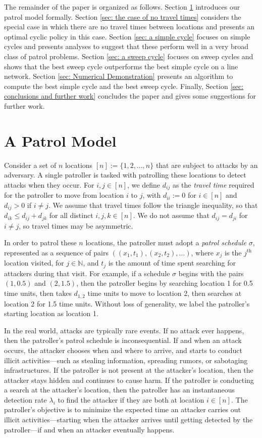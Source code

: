 \documentclass[11pt,a4paper]{article}
\begin{document}
The remainder of the paper is organized as follows.
Section \ref{sec: a patrol model} introduces our patrol model formally.
Section \ref{sec: the case of no travel times} considers the special case in which there are no travel times between locations and presents an optimal cyclic policy in this case.
Section \ref{sec: a simple cycle} focuses on simple cycles and presents analyses to suggest that these perform well in a very broad class of patrol problems. 
Section \ref{sec: a sweep cycle} focuses on sweep cycles and shows that the best sweep cycle outperforms the best simple cycle on a line network. 
Section \ref{sec: Numerical Demonstration} presents an algorithm to compute the best simple cycle and the best sweep cycle.
Finally, Section \ref{sec: conclusions and further work} concludes the paper and gives some suggestions for further work.

\section{A Patrol Model} \label{sec: a patrol model}
Consider a set of $n$ locations $[n]:=\{1,2,...,n\}$ that are subject to attacks by an adversary.
A single patroller is tasked with patrolling these locations to detect attacks when they occur. 
For $i,j\in [n]$, we define $d_{ij}$ as the \emph{travel time} required for the patroller to move from location $i$ to $j$, with $d_{ii}:=0$ for $i\in [n]$ and $d_{ij}>0$ if $i\neq j$. We assume that travel times follow the triangle inequality, so that $d_{ik}\leq d_{ij}+d_{jk}$ for all distinct $i,j,k\in [n]$. We do not assume that $d_{ij}=d_{ji}$ for $i\neq j$, so travel times may be asymmetric.


In order to patrol these $n$ locations, the patroller must adopt a \emph{patrol schedule} $\sigma$, represented as a sequence of pairs $((x_1,t_1),(x_2,t_2),\ldots)$, where $x_j$ is the $j^{\text{th}}$ location visited, for $j\in\mathbb{N}$, and $t_j$ is the amount of time spent searching for attackers during that visit. 
For example, if a schedule $\sigma$ begins with the pairs $(1,0.5)$ and $(2,1.5)$, then the patroller begins by searching location 1 for 0.5 time units, then takes $d_{1,2}$ time units to move to location 2, then searches at location 2 for 1.5 time units. 
Without loss of generality, we label the patroller's starting location as location 1.

In the real world, attacks are typically rare events.
If no attack ever happens, then the patroller's patrol schedule is inconsequential.
If and when an attack occurs, the attacker chooses when and where to arrive, and starts to conduct illicit activities---such as stealing information, spreading rumors, or sabotaging infrastructures.
If the patroller is not present at the attacker's location, then the attacker stays hidden and continues to cause harm.
If the patroller is conducting a search at the attacker's location, then the patroller has an instantaneous detection rate $\lambda_i$ to find the attacker if they are both at location $i \in [n]$.
The patroller's objective is to minimize the expected time an attacker carries out illicit activities---starting when the attacker arrives until getting detected by the patroller---if and when an attacker eventually happens.
\end{document}
